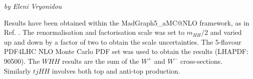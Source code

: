 
\begin{center}
    \textit{by Eleni Vryonidou}
\end{center}

\begin{table}[h!]
\renewcommand{\arraystretch}{1.6}
\begin{center}
 \label{table:xsec2}
 \caption{Signal cross section (in fb) for HH production at NLO QCD.}  
\end{center} 
\end{table}
Results have been obtained within the {\sc MadGraph5\_aMC@NLO} \cite{Alwall:2014hca} framework, as in Ref. \cite{Frederix:2014hta}. The renormalisation and factorisation scale was set to $m_{HH}/2$ and varied up and down by a factor of two to obtain the scale uncertainties. The 5-flavour PDF4LHC NLO Monte Carlo PDF set was used to obtain the results (LHAPDF: 90500). The $WHH$ results are the sum of the $W^+$ and $W^-$ cross-sections. Similarly $tjHH$ involves both top and anti-top production. 